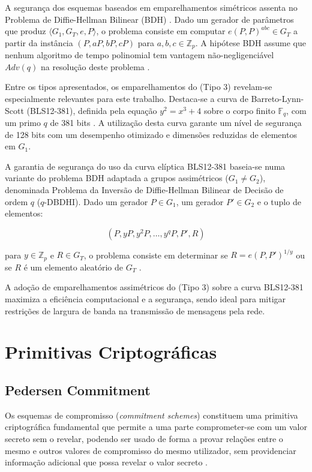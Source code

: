A segurança dos esquemas baseados em emparelhamentos simétricos assenta no Problema de Diffie-Hellman Bilinear (BDH) \cite{boneh2001ibe}. Dado um gerador de parâmetros que produz $\langle G_1, G_T, e, P \rangle$, o problema consiste em computar $e(P,P)^{abc} \in G_T$ a partir da instância $(P, aP, bP, cP)$ para $a,b,c \in \mathbb{Z}_p$. A hipótese BDH assume que nenhum algoritmo de tempo polinomial tem vantagem não-negligenciável $Adv(q)$ na resolução deste problema \cite{boneh2001ibe}.

Entre os tipos apresentados, os emparelhamentos do (Tipo 3) revelam-se especialmente relevantes para este trabalho. Destaca-se a curva de Barreto-Lynn-Scott (BLS12-381), definida pela equação $y^2 = x^3 + 4$ sobre o corpo finito $\mathbb{F}_q$, com um primo $q$ de 381 bits \cite{salin2023pairing, electriccoin_bls12381}. A utilização desta curva garante um nível de segurança de 128 bits com um desempenho otimizado e dimensões reduzidas de elementos em $G_1$.

A garantia de segurança do uso da curva elíptica BLS12-381 baseia-se numa variante do problema BDH adaptada a grupos assimétricos ($G_1 \neq G_2$), denominada Problema da Inversão de Diffie-Hellman Bilinear de Decisão de ordem $q$ ($q$-DBDHI). Dado um gerador $P \in G_1$, um gerador $P' \in G_2$ e o tuplo de elementos:

\begin{equation*}
    (P, yP, y^2P, \ldots, y^qP, P', R)
\end{equation*}

para $y \in \mathbb{Z}_p$ e $R \in G_T$, o problema consiste em determinar se $R = e(P,P')^{1/y}$ ou se $R$ é um elemento aleatório de $G_T$ \cite{salin2023pairing}.

A adoção de emparelhamentos assimétricos do (Tipo 3) sobre a curva BLS12-381 maximiza a eficiência computacional e a segurança, sendo ideal para mitigar restrições de largura de banda na transmissão de mensagens pela rede.

\section{Primitivas Criptográficas}

\subsection{Pedersen Commitment}

Os esquemas de compromisso (\textit{commitment schemes}) constituem uma primitiva criptográfica fundamental que permite a uma parte comprometer-se com um valor secreto sem o revelar, podendo ser usado de forma a provar relações entre o mesmo e outros valores de compromisso do mesmo utilizador, sem providenciar informação adicional que possa revelar o valor secreto \cite{yu2020simple}.


